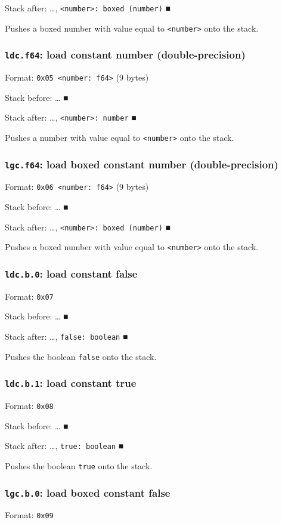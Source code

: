 \documentclass[11pt]{article}
\begin{document}
Stack after: \ldots{}​, \texttt{<number>: boxed (number)} ■

Pushes a boxed number with value equal to \texttt{<number>} onto the stack.

\subsubsection{\texttt{ldc.f64}: load constant number (double-precision)}
\label{sec:org6bba761}
Format: \texttt{0x05 <number: f64>} (9 bytes)

Stack before: \ldots{}​ ■

Stack after: \ldots{}​, \texttt{<number>: number} ■

Pushes a number with value equal to \texttt{<number>} onto the stack.

\subsubsection{\texttt{lgc.f64}: load boxed constant number (double-precision)}
\label{sec:orgae88789}
Format: \texttt{0x06 <number: f64>} (9 bytes)

Stack before: \ldots{}​ ■

Stack after: \ldots{}​, \texttt{<number>: boxed (number)} ■

Pushes a boxed number with value equal to \texttt{<number>} onto the stack.

\subsubsection{\texttt{ldc.b.0}: load constant false}
\label{sec:org628c82c}
Format: \texttt{0x07}

Stack before: \ldots{}​ ■

Stack after: \ldots{}​, \texttt{false: boolean} ■

Pushes the boolean \texttt{false} onto the stack.

\subsubsection{\texttt{ldc.b.1}: load constant true}
\label{sec:org45a4edf}
Format: \texttt{0x08}

Stack before: \ldots{}​ ■

Stack after: \ldots{}​, \texttt{true: boolean} ■

Pushes the boolean \texttt{true} onto the stack.

\subsubsection{\texttt{lgc.b.0}: load boxed constant false}
\label{sec:orgdf93d05}
Format: \texttt{0x09}
\end{document}
